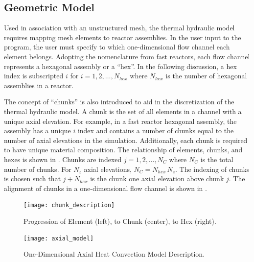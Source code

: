   \subsection{Geometric Model}
    Used in association with an unstructured mesh, the thermal hydraulic model
    requires mapping mesh elements to reactor assemblies. In the user input to
    the program, the user must specify to which one-dimensional flow channel 
    each element belongs.
    Adopting the nomenclature from fast reactors, each flow channel represents a
    hexagonal assembly or a ``hex''. In the following discussion, a hex index is
    subscripted $i$ for $i = 1,2,\ldots,N_{hex}$ where $N_{hex}$ is the number
    of hexagonal assemblies in a reactor. 

    The concept of ``chunks'' is also introduced to aid in the discretization of
    the thermal hydraulic model. A chunk is the set of all elements in a channel
    with a unique axial elevation. For example, in a fast reactor hexagonal
    assembly, the assembly has a unique $i$ index and contains a number of 
    chunks equal to the number of axial elevations in the simulation. 
    Additionally, each chunk is required to have unique material composition. 
    The relationship of elements, chunks, and hexes is shown in 
    . Chunks are indexed $j = 1,2,\ldots,N_C$ where
    $N_C$ is the total number of chunks.  For $N_z$ axial elevations, 
    $N_C = N_{hex} \, N_z$. The indexing of chunks is chosen such that 
    $j+N_{hex}$ is the chunk one axial elevation above chunk $j$. The alignment
    of chunks in a one-dimensional flow channel is shown in
    .

    \begin{figure}
      \centering
      \texttt{[image: chunk\_description]}
      \caption{Progression of Element (left), to Chunk (center), to Hex 
        (right).}
      \label{fig:chunk_description}
    \end{figure}
    
    \begin{figure}
      \centering
      \texttt{[image: axial\_model]}
      \caption{One-Dimensional Axial Heat Convection Model Description.}
      \label{fig:axial_model}
    \end{figure}

